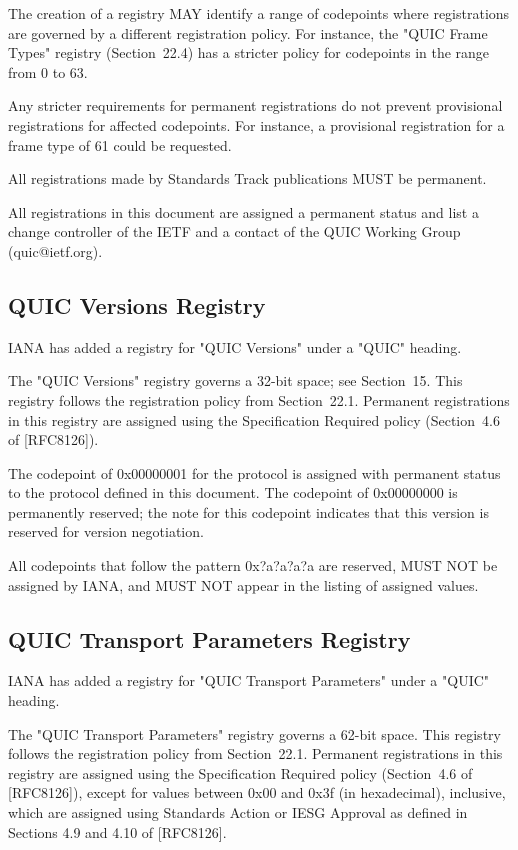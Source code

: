 \documentclass{article}
\begin{document}
The creation of a registry MAY identify a range of codepoints where registrations are governed by a different registration policy.  For instance, the "QUIC Frame Types" registry (Section~22.4) has a stricter policy for codepoints in the range from 0 to 63.

Any stricter requirements for permanent registrations do not prevent provisional registrations for affected codepoints.  For instance, a provisional registration for a frame type of 61 could be requested.

All registrations made by Standards Track publications MUST be permanent.

All registrations in this document are assigned a permanent status and list a change controller of the IETF and a contact of the QUIC Working Group (quic@ietf.org).

\subsection{QUIC Versions Registry}

IANA has added a registry for "QUIC Versions" under a "QUIC" heading.

The "QUIC Versions" registry governs a 32-bit space; see Section~15. This registry follows the registration policy from Section~22.1. Permanent registrations in this registry are assigned using the Specification Required policy (Section~4.6 of [RFC8126]).

The codepoint of 0x00000001 for the protocol is assigned with permanent status to the protocol defined in this document.  The codepoint of 0x00000000 is permanently reserved; the note for this codepoint indicates that this version is reserved for version negotiation.

All codepoints that follow the pattern 0x?a?a?a?a are reserved, MUST NOT be assigned by IANA, and MUST NOT appear in the listing of assigned values.

\subsection{QUIC Transport Parameters Registry}

IANA has added a registry for "QUIC Transport Parameters" under a "QUIC" heading.

The "QUIC Transport Parameters" registry governs a 62-bit space. This registry follows the registration policy from Section~22.1. Permanent registrations in this registry are assigned using the Specification Required policy (Section~4.6 of [RFC8126]), except for values between 0x00 and 0x3f (in hexadecimal), inclusive, which are assigned using Standards Action or IESG Approval as defined in Sections 4.9 and 4.10 of [RFC8126].
\end{document}
